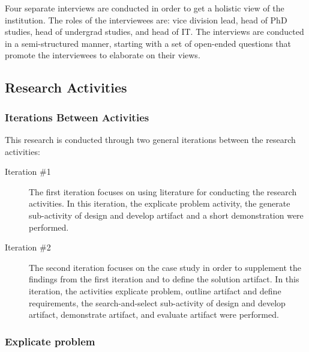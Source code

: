 Four separate interviews are conducted in order to get a holistic view of the institution. The roles of the interviewees are: vice division lead, head of PhD studies, head of undergrad studies, and head of IT. The interviews are conducted in a semi-structured manner, starting with a set of open-ended questions that promote the interviewees to elaborate on their views. 

\subsection{Research Activities}
\label{subsection:research_activities}

\subsubsection*{Iterations Between Activities}

This research is conducted through two general iterations between the research activities:
\begin{description}
  \item[Iteration \#1] The first iteration focuses on using literature for conducting the research activities. In this iteration, the explicate problem activity, the generate sub-activity of design and develop artifact and a short demonstration were performed. %
  \item[Iteration \#2] The second iteration focuses on the case study in order to supplement the findings from the first iteration and to define the solution artifact. In this iteration, the activities explicate problem, outline artifact and define requirements, the search-and-select sub-activity of design and develop artifact, demonstrate artifact, and evaluate artifact were performed.%
\end{description}

\subsubsection*{Explicate problem}

